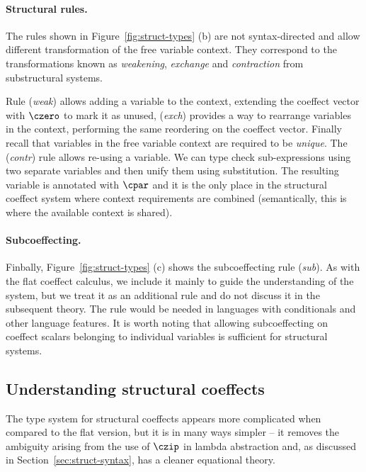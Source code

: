 \paragraph{Structural rules.}
The rules shown in Figure~\ref{fig:struct-types} (b) are not syntax-directed and
allow different transformation of the free variable context. They correspond to the
transformations known as \emph{weakening}, \emph{exchange} and \emph{contraction}
from substructural systems.

Rule (\emph{weak}) allows adding a variable to the context, extending the coeffect
vector with $\czero$ to mark it as unused, (\emph{exch}) provides a way to rearrange variables
in the context, performing the same reordering on the coeffect vector. Finally recall that
variables in the free variable context are required to be \emph{unique}. The (\emph{contr}) rule
allows re-using a variable. We can type check sub-expressions using two separate variables and
then unify them using substitution. The resulting variable is annotated with $\cpar$ and it
is the only place in the structural coeffect system where context requirements are combined
(semantically, this is where the available context is shared).

\paragraph{Subcoeffecting.}
Finbally, Figure~\ref{fig:struct-types} (c) shows the subcoeffecting rule (\emph{sub}).
As with the flat coeffect calculus, we include it mainly to guide the understanding of the
system, but we treat it as an additional rule and do not discuss it in the subsequent theory.
The rule would be needed in languages with conditionals and other language features. It is
worth noting that allowing subcoeffecting on coeffect scalars belonging to individual variables
is sufficient for structural systems.


\subsection{Understanding structural coeffects}

The type system for structural coeffects appears more complicated when compared to the flat
version, but it is in many ways simpler -- it removes the ambiguity arising from the use
of $\czip$ in lambda abstraction and, as discussed in Section~\ref{sec:struct-syntax}, has
a cleaner equational theory.

